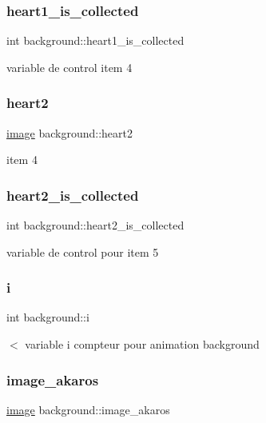 \subsubsection{\texorpdfstring{heart1\+\_\+is\+\_\+collected}{heart1\_is\_collected}}
{\footnotesize\ttfamily int background\+::heart1\+\_\+is\+\_\+collected}

variable de control item 4 \mbox{\label{structbackground_a6e78aa5d361b94d7c2c9eebacde96866}} 
\subsubsection{\texorpdfstring{heart2}{heart2}}
{\footnotesize\ttfamily \hyperlink{structimage}{image} background\+::heart2}

item 4 \mbox{\label{structbackground_a772cfb2b19e4d374985066cb04acc4ce}} 
\subsubsection{\texorpdfstring{heart2\+\_\+is\+\_\+collected}{heart2\_is\_collected}}
{\footnotesize\ttfamily int background\+::heart2\+\_\+is\+\_\+collected}

variable de control pour item 5 \mbox{\label{structbackground_a59ac2f68be9169f063bcd8caf00689ad}} 
\subsubsection{\texorpdfstring{i}{i}}
{\footnotesize\ttfamily int background\+::i}

$<$ variable i compteur pour animation background \mbox{\label{structbackground_a4356ff725e07528178c0c5cef56aa994}} 
\subsubsection{\texorpdfstring{image\+\_\+akaros}{image\_akaros}}
{\footnotesize\ttfamily \hyperlink{structimage}{image} background\+::image\+\_\+akaros}

